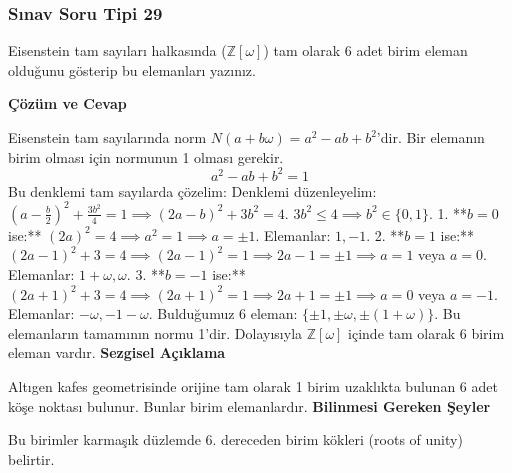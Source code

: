 \documentclass[11pt, a4paper]{article}
\newenvironment{cozum}{
    \vspace{0.5cm}
    \noindent\textcolor{green!60!black}{\faCheckCircle\enspace \textbf{\Large Çözüm ve Cevap}}\par\vspace{0.2cm}
}{}
\newenvironment{sezgisel}{
    \vspace{0.5cm}
    \noindent\textcolor{orange!80!black}{\faLightbulb\enspace \textbf{\Large Sezgisel Açıklama}}\par\vspace{0.2cm}
    \itshape
}{}
\newenvironment{bilgi}{
    \vspace{0.5cm}
    \noindent\textcolor{red!70!black}{\faExclamationTriangle\enspace \textbf{\Large Bilinmesi Gereken Şeyler}}\par\vspace{0.2cm}
}{}
\begin{document}
\subsubsection{Sınav Soru Tipi 29}
\begin{sinavbox}
Eisenstein tam sayıları halkasında ($\mathbb{Z}[\omega]$) tam olarak 6 adet birim eleman olduğunu gösterip bu elemanları yazınız.
\end{sinavbox}
\begin{cozum}
Eisenstein tam sayılarında norm $N(a+b\omega) = a^2-ab+b^2$'dir. Bir elemanın birim olması için normunun 1 olması gerekir.
\[ a^2 - ab + b^2 = 1 \]
Bu denklemi tam sayılarda çözelim:
Denklemi düzenleyelim: $\left(a - \frac{b}{2}\right)^2 + \frac{3b^2}{4} = 1 \implies (2a-b)^2 + 3b^2 = 4$.
$3b^2 \le 4 \implies b^2 \in \{0, 1\}$.
1. **$b = 0$ ise:** $(2a)^2 = 4 \implies a^2 = 1 \implies a = \pm 1$.
   Elemanlar: $1, -1$.
2. **$b = 1$ ise:** $(2a-1)^2 + 3 = 4 \implies (2a-1)^2 = 1 \implies 2a-1 = \pm 1 \implies a=1$ veya $a=0$.
   Elemanlar: $1+\omega, \omega$.
3. **$b = -1$ ise:** $(2a+1)^2 + 3 = 4 \implies (2a+1)^2 = 1 \implies 2a+1 = \pm 1 \implies a=0$ veya $a=-1$.
   Elemanlar: $-\omega, -1-\omega$.
Bulduğumuz 6 eleman: $\{\pm 1, \pm \omega, \pm (1+\omega)\}$.
Bu elemanların tamamının normu 1'dir. Dolayısıyla $\mathbb{Z}[\omega]$ içinde tam olarak 6 birim eleman vardır.
\end{cozum}
\begin{sezgisel}
Altıgen kafes geometrisinde orijine tam olarak 1 birim uzaklıkta bulunan 6 adet köşe noktası bulunur. Bunlar birim elemanlardır.
\end{sezgisel}
\begin{bilgi}
Bu birimler karmaşık düzlemde 6. dereceden birim kökleri (roots of unity) belirtir.
\end{bilgi}

\newpage
\end{document}
